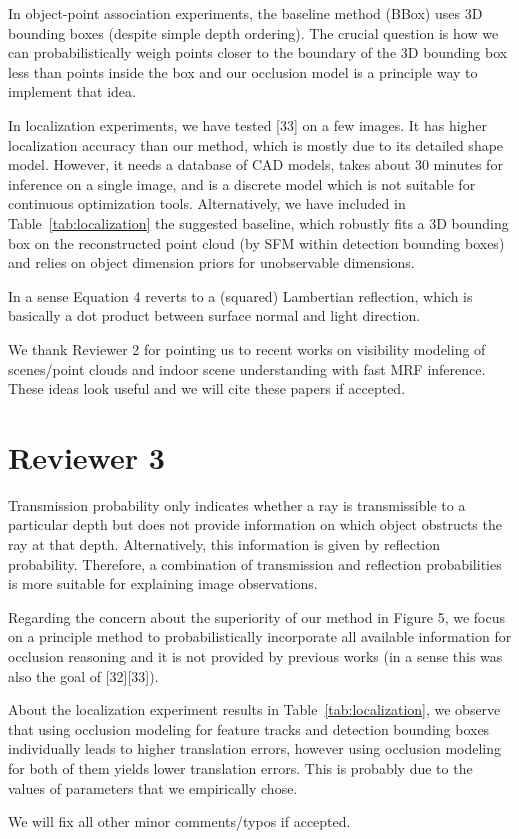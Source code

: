 \documentclass[10pt,twocolumn,letterpaper]{article}
\begin{document}
In object-point association experiments, the baseline method (BBox) uses 3D bounding boxes (despite simple depth ordering). The crucial question is how we can probabilistically weigh points closer to the boundary of the 3D bounding box less than points inside the box and our occlusion model is a principle way to implement that idea.

In localization experiments, we have tested [33] on a few images. It has higher localization accuracy than our method, which is mostly due to its detailed shape model. However, it needs a database of CAD models, takes about 30 minutes for inference on a single image, and is a discrete model which is not suitable for continuous optimization tools. Alternatively, we have included in Table~\ref{tab:localization} the suggested baseline, which robustly fits a 3D bounding box on the reconstructed point cloud (by SFM within detection bounding boxes) and relies on object dimension priors for unobservable dimensions.

In a sense Equation 4 reverts to a (squared) Lambertian reflection, which is basically a dot product between surface normal and light direction.

We thank Reviewer 2 for pointing us to recent works on visibility modeling of scenes/point clouds and indoor scene understanding with fast MRF inference. These ideas look useful and we will cite these papers if accepted.

\section{Reviewer 3}

Transmission probability only indicates whether a ray is transmissible to a particular depth but does not provide information on which object obstructs the ray at that depth. Alternatively, this information is given by reflection probability. Therefore, a combination of transmission and reflection probabilities is more suitable for explaining image observations.

Regarding the concern about the superiority of our method in Figure 5, we focus on a principle method to probabilistically incorporate all available information for occlusion reasoning and it is not provided by previous works (in a sense this was also the goal of [32][33]).

About the localization experiment results in Table~\ref{tab:localization}, we observe that using occlusion modeling for feature tracks and detection bounding boxes individually leads to higher translation errors, however using occlusion modeling for both of them yields lower translation errors. This is probably due to the values of parameters that we empirically chose.

We will fix all other minor comments/typos if accepted.
\end{document}
